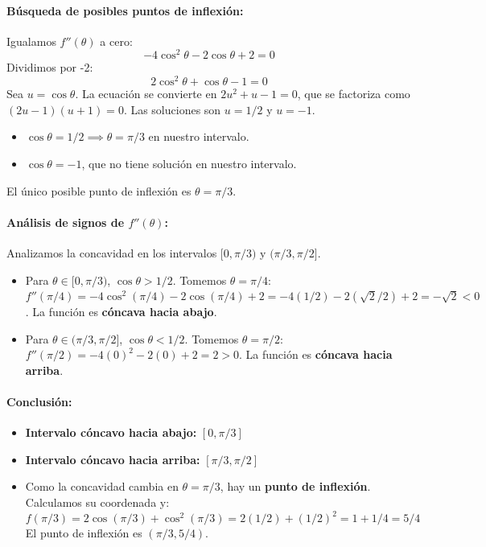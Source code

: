 \documentclass[12pt, letterpaper]{article}
\begin{document}
\paragraph{Búsqueda de posibles puntos de inflexión:}
Igualamos $f''(\theta)$ a cero:
$$ -4\cos^2\theta - 2\cos\theta + 2 = 0 $$
Dividimos por -2:
$$ 2\cos^2\theta + \cos\theta - 1 = 0 $$
Sea $u = \cos\theta$. La ecuación se convierte en $2u^2 + u - 1 = 0$, que se factoriza como $(2u-1)(u+1) = 0$. Las soluciones son $u = 1/2$ y $u = -1$.
\begin{itemize}
    \item $\cos\theta = 1/2 \implies \theta = \pi/3$ en nuestro intervalo.
    \item $\cos\theta = -1$, que no tiene solución en nuestro intervalo.
\end{itemize}
El único posible punto de inflexión es $\theta = \pi/3$.

\paragraph{Análisis de signos de $f''(\theta)$:}
Analizamos la concavidad en los intervalos $[0, \pi/3)$ y $(\pi/3, \pi/2]$.
\begin{itemize}
    \item Para $\theta \in [0, \pi/3)$, $\cos\theta > 1/2$. Tomemos $\theta = \pi/4$:
    $f''(\pi/4) = -4\cos^2(\pi/4) - 2\cos(\pi/4) + 2 = -4(1/2) - 2(\sqrt{2}/2) + 2 = -\sqrt{2} < 0$.
    La función es \textbf{cóncava hacia abajo}.
    \item Para $\theta \in (\pi/3, \pi/2]$, $\cos\theta < 1/2$. Tomemos $\theta = \pi/2$:
    $f''(\pi/2) = -4(0)^2 - 2(0) + 2 = 2 > 0$.
    La función es \textbf{cóncava hacia arriba}.
\end{itemize}

\paragraph{Conclusión:}
\begin{itemize}
    \item \textbf{Intervalo cóncavo hacia abajo:} $[0, \pi/3]$
    \item \textbf{Intervalo cóncavo hacia arriba:} $[\pi/3, \pi/2]$
    \item Como la concavidad cambia en $\theta = \pi/3$, hay un \textbf{punto de inflexión}.
    Calculamos su coordenada y:
    $$ f(\pi/3) = 2\cos(\pi/3) + \cos^2(\pi/3) = 2(1/2) + (1/2)^2 = 1 + 1/4 = 5/4 $$
    El punto de inflexión es \textbf{$(\pi/3, 5/4)$}.
\end{itemize}
\end{document}
